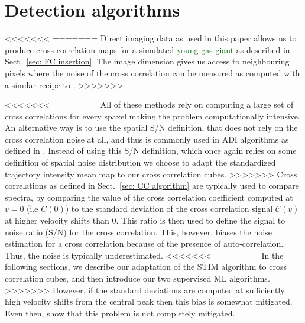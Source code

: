 \documentclass{aa}
\newcommand{\newchange}[1]{\textcolor{darkgreen}{#1}}
\begin{document}
{%

\section{Detection algorithms}
<<<<<<<
=======
Direct imaging data as used in this paper allows us to produce cross correlation maps for a simulated \newchange{young gas giant} as described in Sect.~\ref{sec: FC insertion}.
The image dimension gives us access to neighbouring pixels where the noise of the cross correlation can be measured as computed with a similar recipe to \citet{2022Patapis}.
>>>>>>>
\label{sec:mapbased}


<<<<<<<
=======
All of these methods rely on computing a large set of cross correlations for every spaxel making the problem computationally intensive.
An alternative way is to use the spatial S/N definition, that does not rely on the cross correlation noise at all, and thus is commonly used in ADI algorithms as defined in \citet{2014MawetSNR}.
Instead of using this S/N definition, which once again relies on some definition of spatial noise distribution we choose to adapt the standardized trajectory intensity mean \citep[STIM,][]{2019Pairet} map to our cross correlation cubes. 
>>>>>>>
Cross correlations as defined in Sect.~\ref{sec: CC algorithm} are typically used to compare spectra, by comparing the value of the cross correlation coefficient computed at $v=0$ (i.e $C(0)$) to the standard deviation of the cross correlation signal $\mathcal{C}(v)$ at higher velocity shifts than $0$.
This ratio is then used to define the signal to noise ratio (S/N) for the cross correlation.
This, however, biases the noise estimation for a cross correlation because of the presence of auto-correlation.
Thus, the noise is typically underestimated.
<<<<<<<
=======
In the following sections, we describe our adaptation of the STIM algorithm to cross correlation cubes, and then introduce our two supervised ML algorithms.
>>>>>>>
However, if the standard deviations are computed at sufficiently high velocity shifts from the central peak \citep[e.g., for $|v|\ge 250$ km/s in][]{2018AHoeijmakersMM} then this bias is somewhat mitigated.
Even then, \citet{ruffio2019radial} show that this problem is not completely mitigated. 

}
\end{document}
